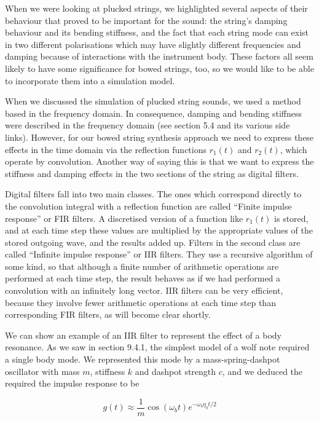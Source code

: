   When we were looking at plucked strings, we highlighted several aspects of 
  their behaviour that proved to be important for the sound: the string’s 
  damping behaviour and its bending stiffness, and the fact that each string 
  mode can exist in two different polarisations which may have slightly 
  different frequencies and damping because of interactions with the instrument 
  body. These factors all seem likely to have some significance for bowed 
  strings, too, so we would like to be able to incorporate them into a 
  simulation model. 

  When we discussed the simulation of plucked string sounds, we used a method 
  based in the frequency domain. In consequence, damping and bending stiffness 
  were described in the frequency domain (see section 5.4 and its various side 
  links). However, for our bowed string synthesis approach we need to express 
  these effects in the time domain via the reflection functions $r_1(t)$ and 
  $r_2(t)$, which operate by convolution. Another way of saying this is that we 
  want to express the stiffness and damping effects in the two sections of the 
  string as digital filters. 

  Digital filters fall into two main classes. The ones which correspond 
  directly to the convolution integral with a reflection function are called 
  ``Finite impulse response'' or FIR filters. A discretised version of a 
  function like $r_1(t)$ is stored, and at each time step these values are 
  multiplied by the appropriate values of the stored outgoing wave, and the 
  results added up. Filters in the second class are called ``Infinite impulse 
  response'' or IIR filters. They use a recursive algorithm of some kind, so 
  that although a finite number of arithmetic operations are performed at each 
  time step, the result behaves as if we had performed a convolution with an 
  infinitely long vector. IIR filters can be very efficient, because they 
  involve fewer arithmetic operations at each time step than corresponding FIR 
  filters, as will become clear shortly. 

  We can show an example of an IIR filter to represent the effect of a body 
  resonance. As we saw in section 9.4.1, the simplest model of a wolf note 
  required a single body mode. We represented this mode by a 
  mass-spring-dashpot oscillator with mass $m$, stiffness $k$ and dashpot 
  strength $c$, and we deduced the required the impulse response to be 

  $$g(t) \approx \dfrac{1}{m} \cos (\omega_b t) e^{-\omega_b \eta_b t/2} 
  \tag{1}$$ 

